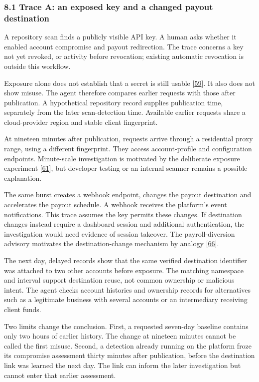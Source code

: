 \documentclass[
  11pt,
]{article}
\begin{document}
\hypertarget{trace-a-an-exposed-key-and-a-changed-payout-destination}{%
\subsubsection{8.1 Trace A: an exposed key and a changed payout
destination}\label{trace-a-an-exposed-key-and-a-changed-payout-destination}}

A repository scan finds a publicly visible API key. A human asks whether
it enabled account compromise and payout redirection. The trace concerns
a key not yet revoked, or activity before revocation; existing automatic
revocation is outside this workflow.

Exposure alone does not establish that a secret is still usable
{[}\protect\hyperlink{ref-Meli2019}{59}{]}. It also does not show
misuse. The agent therefore compares earlier requests with those after
publication. A hypothetical repository record supplies publication time,
separately from the later scan-detection time. Available earlier
requests share a cloud-provider region and stable client fingerprint.

At nineteen minutes after publication, requests arrive through a
residential proxy range, using a different fingerprint. They access
account-profile and configuration endpoints. Minute-scale investigation
is motivated by the deliberate exposure experiment
{[}\protect\hyperlink{ref-Gamazo2023}{61}{]}, but developer testing or
an internal scanner remains a possible explanation.

The same burst creates a webhook endpoint, changes the payout
destination and accelerates the payout schedule. A webhook receives the
platform's event notifications. This trace assumes the key permits these
changes. If destination changes instead require a dashboard session and
additional authentication, the investigation would need evidence of
session takeover. The payroll-diversion advisory motivates the
destination-change mechanism by analogy
{[}\protect\hyperlink{ref-FBI2018}{66}{]}.

The next day, delayed records show that the same verified destination
identifier was attached to two other accounts before exposure. The
matching namespace and interval support destination reuse, not common
ownership or malicious intent. The agent checks account histories and
ownership records for alternatives such as a legitimate business with
several accounts or an intermediary receiving client funds.

Two limits change the conclusion. First, a requested seven-day baseline
contains only two hours of earlier history. The change at nineteen
minutes cannot be called the first misuse. Second, a detection already
running on the platform froze its compromise assessment thirty minutes
after publication, before the destination link was learned the next day.
The link can inform the later investigation but cannot enter that
earlier assessment.
\end{document}

